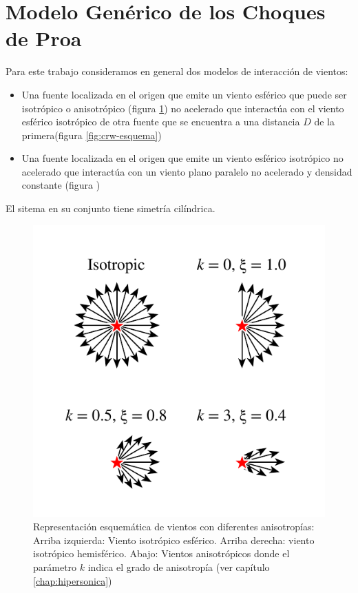 \section{Modelo Genérico de los Choques de Proa}
\label{sec:Modelo-generico}
Para este trabajo consideramos en general dos modelos de
interacción  de vientos:
\begin{itemize}
\item Una fuente localizada en el origen que emite un viento esférico
  que puede ser isotrópico o anisotrópico (figura
  \ref{fig:isotropic-aniso}) no acelerado que interactúa con el viento
  esférico isotrópico de otra fuente que se encuentra a una distancia
  $D$ de la primera(figura \ref{fig:crw-esquema})
\item Una fuente localizada en el origen que emite un viento esférico
  isotrópico no acelerado que interactúa con un viento plano paralelo
  no acelerado y densidad constante (figura )
\end{itemize}
El sitema en su conjunto tiene simetría cilíndrica.
\begin{figure}
  \includegraphics[width=0.5\linewidth]{./Figures/anisotropic-arrows}
  \caption{Representación esquemática de vientos con diferentes
    anisotropías:
    Arriba izquierda: Viento isotrópico esférico. Arriba derecha: viento
    isotrópico hemisférico. Abajo: Vientos anisotrópicos donde el
    parámetro $k$ indica el grado de anisotropía (ver capítulo \ref{chap:hipersonica})}
    \label{fig:isotropic-aniso}
\end{figure}
